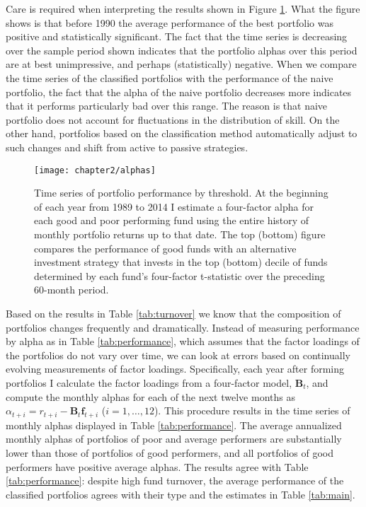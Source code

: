 		Care is required when interpreting the results shown in Figure \ref{fig:performance}. What the figure shows is that before 1990 the average performance of the best portfolio was positive and statistically significant. The fact that the time series is decreasing over the sample period shown indicates that the portfolio alphas over this period are at best unimpressive, and perhaps (statistically) negative. When we compare the time series of the classified portfolios with the performance of the naive portfolio, the fact that the alpha of the naive portfolio decreases more indicates that it performs particularly bad over this range. The reason is that naive portfolio does not account for fluctuations in the distribution of skill. On the other hand, portfolios based on the classification method automatically adjust to such changes and shift from active to passive strategies.

		\begin{figure}[t]
			\small
			\centering
			\texttt{[image: chapter2/alphas]}
			\captionsetup{skip=-20pt, font=footnotesize, justification=justified, width=\textwidth}
			\caption[Time series of portfolio performance by threshold]{Time series of portfolio performance by threshold. At the beginning of each year from 1989 to 2014 I estimate a four-factor alpha for each good and poor performing fund using the entire history of monthly portfolio returns up to that date. The top (bottom) figure compares the performance of good funds with an alternative investment strategy that invests in the top (bottom) decile of funds determined by each fund’s four-factor t-statistic over the preceding 60-month period.}
			\label{fig:performance}
		\end{figure}

		Based on the results in Table \ref{tab:turnover} we know that the composition of portfolios changes frequently and dramatically.  Instead of measuring performance by alpha as in Table \ref{tab:performance}, which assumes that the factor loadings of the portfolios do not vary over time, we can look at errors based on continually evolving measurements of factor loadings.  Specifically, each year after forming portfolios I calculate the factor loadings from a four-factor model, $\mathbf{B}_t$, and compute the monthly alphas for each of the next twelve months as $\alpha_{t+i} = r_{t+i} - \mathbf{B}_t \mathbf{f}_{t+i}$ ($i=1, \dots, 12$).  This procedure results in the time series of monthly alphas displayed in Table \ref{tab:performance}. The average annualized monthly alphas of portfolios of poor and average performers are substantially lower than those of portfolios of good performers, and all portfolios of good performers have positive average alphas.  The results agree with Table \ref{tab:performance}: despite high fund turnover, the average performance of the classified portfolios agrees with their type and the estimates in Table \ref{tab:main}.


